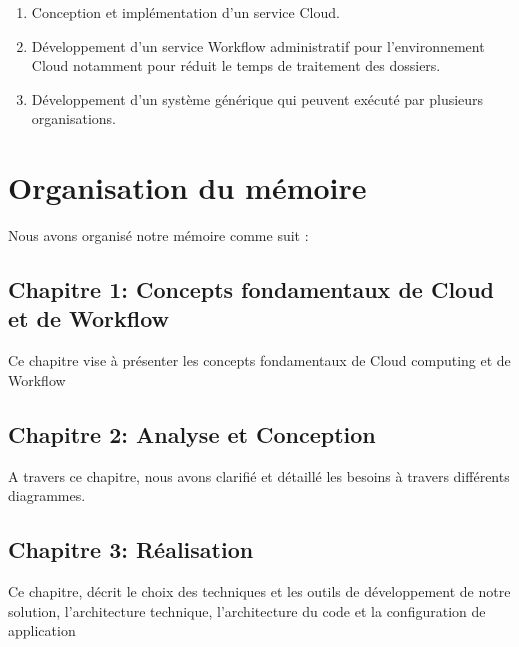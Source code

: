 \begin{enumerate}
\item Conception et implémentation d'un service Cloud.

\item Développement d'un service Workflow administratif  pour l'environnement Cloud notamment pour réduit le temps de traitement des dossiers.  

\item Développement d'un système générique qui peuvent exécuté par plusieurs  organisations. 
\end{enumerate}



\section*{Organisation du mémoire}

Nous avons organisé notre mémoire comme suit : 
\subsection*{Chapitre 1: Concepts fondamentaux de Cloud et de Workflow} 

Ce chapitre vise à présenter les concepts fondamentaux de Cloud computing  et de Workflow 
\subsection*{Chapitre 2: Analyse et Conception} 
A travers ce chapitre, nous avons clarifié et détaillé les besoins à travers différents diagrammes. 
\subsection*{Chapitre 3: Réalisation}


Ce chapitre, décrit le choix des techniques et les outils de développement de notre solution, l’architecture technique, l’architecture du code et la configuration de application 
